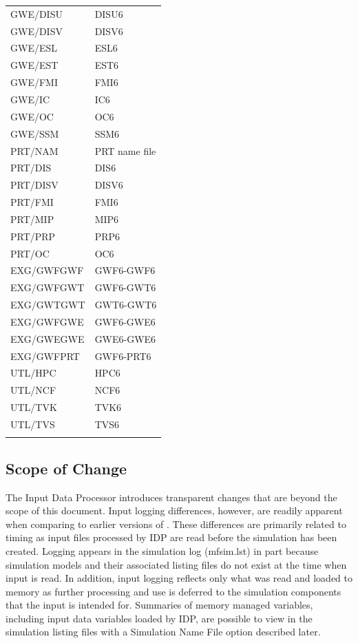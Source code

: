 \begin{longtable}{p{6cm} p{4cm}}
GWE/DISU & DISU6 \\
GWE/DISV & DISV6 \\
GWE/ESL & ESL6 \\
GWE/EST & EST6 \\
GWE/FMI & FMI6 \\
GWE/IC & IC6 \\
GWE/OC & OC6 \\
GWE/SSM & SSM6 \\
\hline
PRT/NAM & PRT name file \\
PRT/DIS & DIS6 \\ 
PRT/DISV & DISV6 \\
PRT/FMI & FMI6 \\
PRT/MIP & MIP6 \\
PRT/PRP & PRP6 \\
PRT/OC & OC6 \\
\hline
EXG/GWFGWF & GWF6-GWF6 \\
EXG/GWFGWT & GWF6-GWT6 \\
EXG/GWTGWT & GWT6-GWT6 \\
EXG/GWFGWE & GWF6-GWE6 \\
EXG/GWEGWE & GWE6-GWE6 \\
EXG/GWFPRT & GWF6-PRT6 \\
\hline
UTL/HPC & HPC6 \\
UTL/NCF & NCF6 \\
UTL/TVK & TVK6 \\
UTL/TVS & TVS6 \\
\hline
\label{table:idmsupported}
\end{longtable}

\subsection{Scope of Change}

The Input Data Processor introduces transparent changes that are beyond the scope of this document.  Input logging differences, however, are readily apparent when comparing to earlier versions of \mf.  These differences are primarily related to timing as input files processed by IDP are read before the simulation has been created.  Logging appears in the simulation log (mfsim.lst) in part because simulation models and their associated listing files do not exist at the time when input is read.  In addition, input logging reflects only what was read and loaded to memory as further processing and use is deferred to the simulation components that the input is intended for.  Summaries of memory managed variables, including input data variables loaded by IDP, are possible to view in the simulation listing files with a Simulation Name File option described later. 

